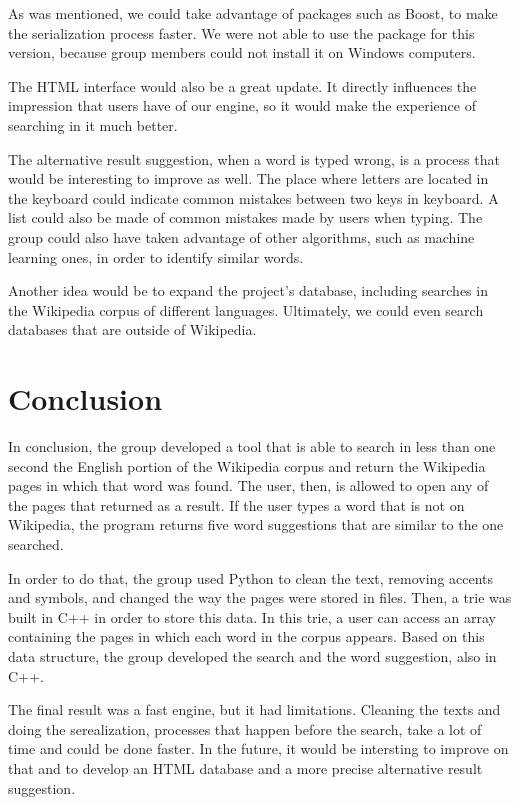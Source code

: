 \documentclass{article}
\begin{document}
As was mentioned, we could take advantage of packages such as Boost, to make the serialization process faster. We were not able to use the package for this version, because group members could not install it on Windows computers. 

The HTML interface would also be a great update. It directly influences the impression that users have of our engine, so it would make the experience of searching in it much better. 

The alternative result suggestion, when a word is typed wrong, is a process that would be interesting to improve as well. The place where letters are located in the keyboard could indicate common mistakes between two keys in keyboard. A list could also be made of common mistakes made by users when typing. The group could also have taken advantage of other algorithms, such as machine learning ones, in order to identify similar words. 

Another idea would be to expand the project's database, including searches in the Wikipedia corpus of different languages. Ultimately, we could even search databases that are outside of Wikipedia. 

\section*{Conclusion}
In conclusion, the group developed a tool that is able to search in less than one second the English portion of the Wikipedia corpus and return the Wikipedia pages in which that word was found. The user, then, is allowed to open any of the pages that returned as a result. If the user types a word that is not on Wikipedia, the program returns five word suggestions that are similar to the one searched. 

In order to do that, the group used Python to clean the text, removing accents and symbols, and changed the way the pages were stored in files. Then, a trie was built in C++ in order to store this data. In this trie, a user can access an array containing the pages in which each word in the corpus appears. Based on this data structure, the group developed the search and the word suggestion, also in C++. 

The final result was a fast engine, but it had limitations. Cleaning the texts and doing the serealization, processes that happen before the search, take a lot of time and could be done faster. In the future, it would be intersting to improve on that and to develop an HTML database and a more precise alternative result suggestion. 
\end{document}
